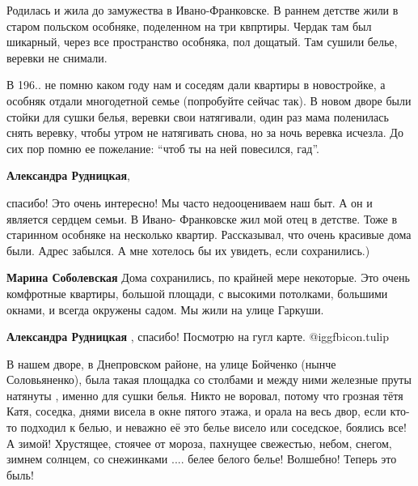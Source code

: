 \begin{itemize}
\begin{itemize}
\end{itemize} %


Родилась и жила до замужества в Ивано-Франковске. В раннем детстве жили в
старом польском особняке, поделенном на три квпртиры. Чердак там был шикарный,
через все пространство особняка, пол дощатый. Там сушили белье, веревки не
снимали.

В 196.. не помню каком году нам и соседям дали квартиры в новостройке, а
особняк отдали многодетной семье (попробуйте сейчас так). В новом дворе были
стойки для сушки белья, веревки свои натягивали, один раз мама поленилась снять
веревку, чтобы утром не натягивать снова, но за ночь веревка исчезла. До сих
пор помню ее пожелание: \enquote{чтоб ты на ней повесился, гад}.

\begin{itemize} %
\textbf{Александра Рудницкая},

спасибо! Это очень интересно! Мы часто недооцениваем наш быт. А он и является
сердцем семьи. В Ивано- Франковске жил мой отец в детстве. Тоже в старинном
особняке на несколько квартир. Рассказывал, что очень красивые дома были. Адрес
забылся. А мне хотелось бы их увидеть, если сохранились.)

\begin{itemize} %
\textbf{Марина Соболевская} Дома сохранились, по крайней мере некоторые. Это очень комфротные квартиры, большой площади, с высокими потолками, большими окнами, и всегда окружены садом. Мы жили на улице Гаркуши.

\textbf{Александра Рудницкая} , спасибо! Посмотрю на гугл карте.  @igg{fbicon.tulip} 
\end{itemize} %

\end{itemize} %


В нашем дворе, в Днепровском районе, на улице Бойченко (нынче Соловьяненко),
была такая площадка со столбами и между ними железные пруты натянуты , именно
для сушки белья. Никто не воровал, потому что грозная тётя Катя, соседка, днями
висела в окне пятого этажа, и орала на весь двор, если кто-то подходил к белью,
и неважно её это белье висело или соседское, боялись все! А зимой! Хрустящее,
стоячее от мороза, пахнущее свежестью, небом, снегом, зимнем солнцем, со
снежинками .... белее белого белье! Волшебно! Теперь это быль!


\end{itemize}
